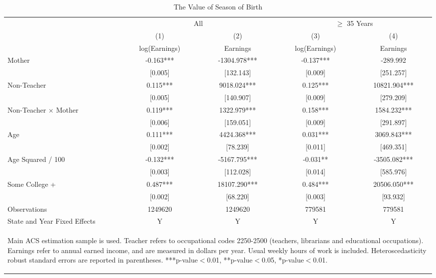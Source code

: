 \documentclass[a4paper, 11.5 pt]{article}
\theoremstyle{plain}
\begin{document}
\begin{doublespace}
\begin{table}[htbp]\centering
\def\sym#1{\ifmmode^{#1}\else\(^{#1}\)\fi}
\caption{The Value of Season of Birth \label{tab:IPUMSInc}}
\begin{tabular}{l*{4}{c}}
\toprule
                    &\multicolumn{2}{c}{All}        &\multicolumn{2}{c}{$\geq$ 35 Years}\\\cmidrule(lr){2-3}\cmidrule(lr){4-5}
                    &\multicolumn{1}{c}{(1)}   &\multicolumn{1}{c}{(2)}   &\multicolumn{1}{c}{(3)}   &\multicolumn{1}{c}{(4)}   \\
                    &log(Earnings)   &    Earnings   &log(Earnings)   &    Earnings   \\
\midrule
Mother              &      -0.163***&   -1304.978***&      -0.137***&    -289.992   \\
                    &     [0.005]   &   [132.143]   &     [0.009]   &   [251.257]   \\
Non-Teacher         &       0.115***&    9018.024***&       0.125***&   10821.904***\\
                    &     [0.005]   &   [140.907]   &     [0.009]   &   [279.209]   \\
Non-Teacher $\times$ Mother&       0.119***&    1322.979***&       0.158***&    1584.232***\\
                    &     [0.006]   &   [159.051]   &     [0.009]   &   [291.897]   \\
Age                 &       0.111***&    4424.368***&       0.031***&    3069.843***\\
                    &     [0.002]   &    [78.239]   &     [0.011]   &   [469.351]   \\
Age Squared / 100   &      -0.132***&   -5167.795***&      -0.031** &   -3505.082***\\
                    &     [0.003]   &   [112.028]   &     [0.014]   &   [585.976]   \\
Some College +      &       0.487***&   18107.290***&       0.484***&   20506.050***\\
                    &     [0.002]   &    [68.220]   &     [0.003]   &    [93.932]   \\
\midrule
Observations        &     1249620   &     1249620   &      779581   &      779581   \\
State and Year Fixed Effects & Y & Y & Y & Y \\
\bottomrule\multicolumn{5}{p{15cm}}{\begin{footnotesize}  Main ACS estimation sample is used.  Teacher refers to occupational codes 2250-2500 (teachers, librarians and educational occupations).  Earnings refer to annual earned income, and are measured in dollars per year. Usual weekly hours of work is included. Heteroscedasticity robust standard errors are reported in parentheses. ***p-value$<$0.01, **p-value$<$0.05, *p-value$<$0.01.
\end{footnotesize}}\end{tabular}\end{table}





\end{doublespace}
\end{document}
